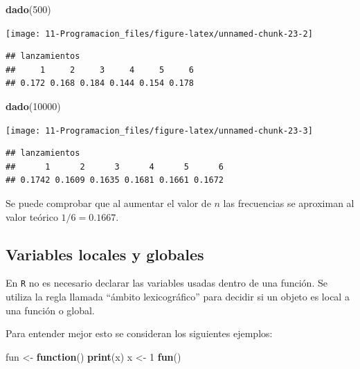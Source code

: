 \documentclass[]{book}
\newenvironment{Shaded}{\begin{snugshade}}{\end{snugshade}}
\newcommand{\KeywordTok}[1]{\textcolor[rgb]{0.13,0.29,0.53}{\textbf{#1}}}
\newcommand{\DecValTok}[1]{\textcolor[rgb]{0.00,0.00,0.81}{#1}}
\newcommand{\StringTok}[1]{\textcolor[rgb]{0.31,0.60,0.02}{#1}}
\newcommand{\ControlFlowTok}[1]{\textcolor[rgb]{0.13,0.29,0.53}{\textbf{#1}}}
\newcommand{\NormalTok}[1]{#1}
\begin{document}
\begin{Shaded}
\begin{Highlighting}[]
\KeywordTok{dado}\NormalTok{(}\DecValTok{500}\NormalTok{)}
\end{Highlighting}
\end{Shaded}

\begin{center}\texttt{[image: 11-Programacion\_files/figure-latex/unnamed-chunk-23-2]} \end{center}

\begin{verbatim}
## lanzamientos
##     1     2     3     4     5     6 
## 0.172 0.168 0.184 0.144 0.154 0.178
\end{verbatim}

\begin{Shaded}
\begin{Highlighting}[]
\KeywordTok{dado}\NormalTok{(}\DecValTok{10000}\NormalTok{)}
\end{Highlighting}
\end{Shaded}

\begin{center}\texttt{[image: 11-Programacion\_files/figure-latex/unnamed-chunk-23-3]} \end{center}

\begin{verbatim}
## lanzamientos
##      1      2      3      4      5      6 
## 0.1742 0.1609 0.1635 0.1681 0.1661 0.1672
\end{verbatim}

Se puede comprobar que al aumentar el valor de \(n\) las frecuencias se
aproximan al valor teórico \(1/6=0.1667\).

\subsection{Variables locales y
globales}\label{variables-locales-y-globales}

En \texttt{R} no es necesario declarar las variables usadas dentro de
una función. Se utiliza la regla llamada ``ámbito lexicográfico'' para
decidir si un objeto es local a una función o global.

Para entender mejor esto se consideran los siguientes ejemplos:

\begin{Shaded}
\begin{Highlighting}[]
\NormalTok{fun <-}\StringTok{ }\ControlFlowTok{function}\NormalTok{() }\KeywordTok{print}\NormalTok{(x)}
\NormalTok{x <-}\StringTok{ }\DecValTok{1}
\KeywordTok{fun}\NormalTok{()}
\end{Highlighting}
\end{Shaded}
\end{document}
